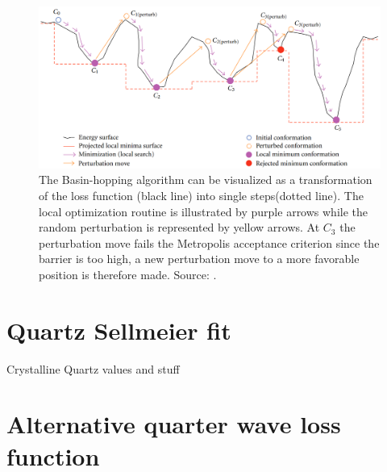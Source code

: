 \begin{figure}[h]
    \centering
    \includegraphics[scale=0.3]{images/7_appendix/bh.png}
    \caption{The Basin-hopping algorithm can be visualized as a transformation of the loss function (black line) into single steps(dotted line). 
    The local optimization routine is illustrated by purple arrows while the random perturbation is represented by yellow arrows. At $C_3$ the perturbation move fails the Metropolis acceptance criterion since the barrier is too high, a new perturbation move to a more favorable position is therefore made. Source: \cite{Olson2012}.}
    \label{fig:Basin-hopping}
\end{figure}

\section{Quartz Sellmeier fit}
\label{sec:sellmeier}
Crystalline Quartz values and stuff

\section{Alternative quarter wave loss function}
\label{sec:int_loss_function}


